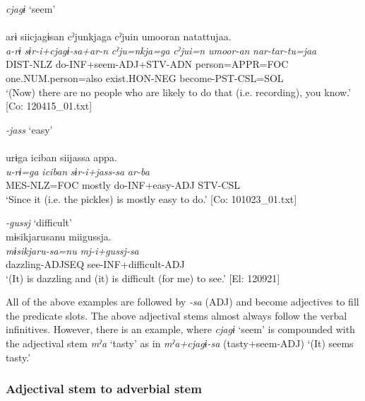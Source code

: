 \ex  \textit{cjagɨ} ‘seem’\\\\
     \glll arɨ  siicjagɨsan  cˀjunkjaga    cˀjuin  umooran  natattujaa.\\
      \textit{a-rɨ}  \textit{sɨr-i+cjagɨ-sa+ar-n}  \textit{cˀju=nkja=ga}   \textit{cˀjui=n}  \textit{umoor-an}  \textit{nar-tar-tu=jaa}\\                                                                          
      DIST-NLZ  do-INF+seem-ADJ+STV-ADN  person=APPR=FOC                   one.NUM.person=also  exist.HON-NEG  become-PST-CSL=SOL\\
     \glt  ‘(Now) there are no people who are likely to do that (i.e. recording), you know.’   [Co: 120415\_01.txt]

\ex \textit{{}-jass} ‘easy’\\\\
    \glll     urɨga  {\textbar}iciban{\textbar}  siijassa  appa.\\
      \textit{u-rɨ=ga}  \textit{iciban}  \textit{sɨr-i+jass-sa}  \textit{ar-ba}\\
      MES-NLZ=FOC  mostly  do-INF+easy-ADJ  STV-CSL\\
      \glt       ‘Since it (i.e. the pickles) is mostly easy to do.’ [Co: 101023\_01.txt]

\ex \textit{{}-gussj} ‘difficult’\\
\glll      mɨsikjarusanu  miigussja.\\
      \textit{mɨsikjaru-sa=nu}  \textit{mj-i+gussj-sa}\\
      dazzling-ADJSEQ  see-INF+difficult-ADJ\\
      \glt       ‘(It) is dazzling and (it) is difficult (for me) to see.’ [El: 120921]
     \z
\z

All of the above examples are followed by \textit{{}-sa} (ADJ) and become adjectives to fill the predicate slots. The above adjectival stems almost always follow the verbal infinitives. However, there is an example, where \textit{cjagɨ} ‘seem’ is compounded with the adjectival stem \textit{mˀa} ‘tasty’ as in \textit{mˀa+cjagɨ-sa} (tasty+seem-ADJ) ‘(It) seems tasty.’

\subsubsection{Adjectival stem to adverbial stem}\label{sec:4.3.8.3}

